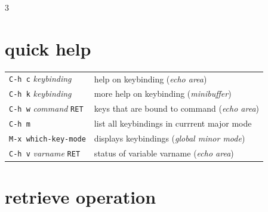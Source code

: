 \documentclass[11pt,landscape,a4paper]{article}
\begin{document}
\begin{multicols}{3}
\vspace{1em}

\section{quick help}

\begin{tabular}{@{}ll@{}}
	{\verb|C-h c| \textit{keybinding}} & help on keybinding (\textit{echo area})\\
	{\verb|C-h k| \textit{keybinding}} & more help on keybinding (\textit{minibuffer})\\
	{\verb|C-h w| \textit{command} \verb|RET|} &  keys that are bound to command (\textit{echo area})\\
	{\verb|C-h m|} &  list all keybindings in currrent major mode\\
	{\verb|M-x which-key-mode|} & displays keybindings  (\textit{global minor mode})\\
	{\verb|C-h v| \textit{varname} \verb|RET|} &  status of variable varname (\textit{echo area})\\
	
\end{tabular}

\section{retrieve operation}


\end{multicols}
\end{document}
